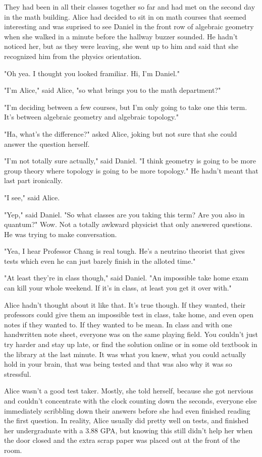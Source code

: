 \mypause

They had been in all their classes together so far and had met on the second day in the math building. Alice had decided to sit in on math courses that seemed interesting and was suprised to see Daniel in the front row of algebraic geometry when she walked in a minute before the hallway buzzer sounded. He hadn't noticed her, but as they were leaving, she went up to him and said that she recognized him from the physics orientation. 

"Oh yea. I thought you looked framiliar. Hi, I'm Daniel."

"I'm Alice," said Alice, "so what brings you to the math department?"

"I'm deciding between a few courses, but I'm only going to take one this term. It's between algebraic geometry and algebraic topology."

"Ha, what's the difference?" asked Alice, joking but not sure that she could answer the question herself.

"I'm not totally sure actually," said Daniel. "I think geometry is going to be more group theory where topology is going to be more topology." He hadn't meant that last part ironically.

"I see," said Alice.

"Yep," said Daniel. "So what classes are you taking this term? Are you also in quantum?" Wow. Not a totally awkward physicist that only answered questions. He was trying to make conversation.

"Yea, I hear Professor Chang is real tough. He's a neutrino theorist that gives tests which even he can just barely finish in the alloted time."

"At least they're in class though," said Daniel. "An impossible take home exam can kill your whole weekend. If it's in class, at least you get it over with."

Alice hadn't thought about it like that. It's true though. If they wanted, their professors could give them an impossible test in class, take home, and even open notes if they wanted to. If they wanted to be mean. In class and with one handwritten note sheet, everyone was on the same playing field. You couldn't just try harder and stay up late, or find the solution online or in some old textbook in the library at the last minute. It was what you knew, what you could actually hold in your brain, that was being tested and that was also why it was so stressful.

Alice wasn't a good test taker. Mostly, she told herself, because she got nervious and couldn't concentrate with the clock counting down the seconds, everyone else immediately scribbling down their answers before she had even finished reading the first question. In reality, Alice usually did pretty well on tests, and finished her undergraduate with a 3.88 GPA, but knowing this still didn't help her when the door closed and the extra scrap paper was placed out at the front of the room.

